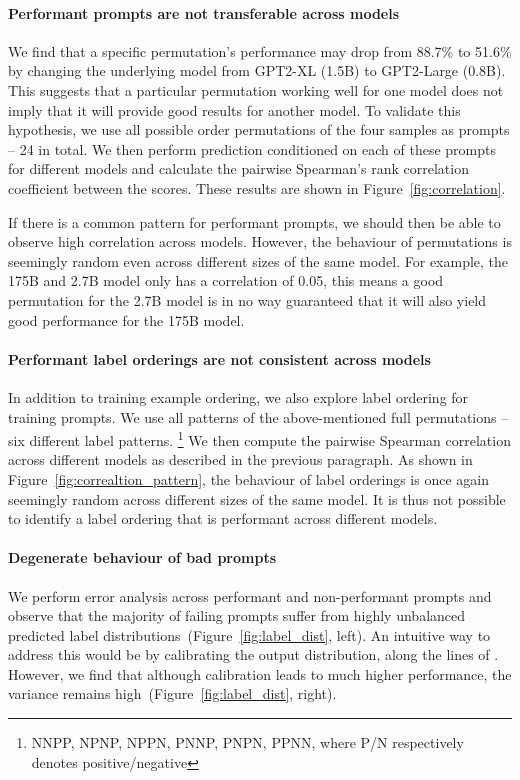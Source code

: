 \paragraph{Performant prompts are not transferable across models} We find that a specific permutation's performance may drop from 88.7\% to 51.6\% by changing the underlying model from GPT2-XL (1.5B) to GPT2-Large (0.8B). This suggests that a particular permutation working well for one model does not imply that it will provide good results for another model. To validate this hypothesis, we use all possible order permutations of the four samples as prompts -- 24 in total. We then perform prediction conditioned on each of these prompts for different models and calculate the pairwise Spearman's rank correlation coefficient between the scores. These results are shown in Figure~\ref{fig:correlation}.

If there is a common pattern for performant prompts, we should then be able to observe high correlation across models. However, the behaviour of permutations is seemingly random even across different sizes of the same model. For example, the 175B and 2.7B model only has a correlation of 0.05, this means a good permutation for the 2.7B model is in no way guaranteed that it will also yield good performance for the 175B model.

\paragraph{Performant label orderings are not consistent across models} In addition to training example ordering, we also explore label ordering for training prompts. We use all patterns of the above-mentioned full permutations -- six different label patterns.
\footnote{NNPP, NPNP, NPPN, PNNP, PNPN, PPNN, where P/N respectively denotes positive/negative} We then compute the pairwise Spearman correlation across different models as described in the previous paragraph. As shown in Figure~\ref{fig:correaltion_pattern}, the behaviour of label orderings is once again seemingly random across different sizes of the same model. It is thus not possible to identify a label ordering that is performant across different models.

\paragraph{Degenerate behaviour of bad prompts} We perform error analysis across performant and non-performant prompts and observe that the majority of failing prompts suffer from highly unbalanced predicted label distributions~(Figure~\ref{fig:label_dist}, left). An intuitive way to address this would be by calibrating the output distribution, along the lines of \citet{zhao2021calibrate}.
However, we find that although calibration leads to much higher performance, the variance remains high~(Figure~\ref{fig:label_dist}, right).

